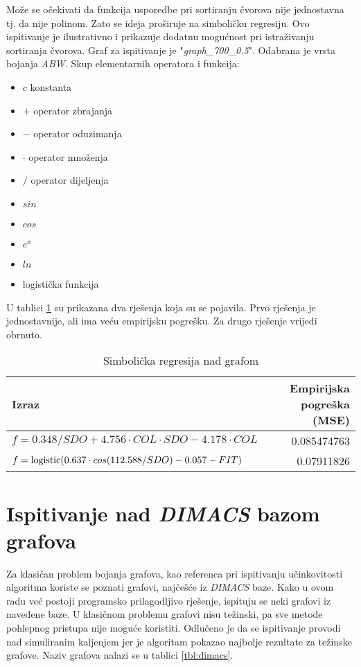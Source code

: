 \documentclass[times, utf8, diplomski, numeric]{fer}
\begin{document}
Može se očekivati da funkcija usporedbe pri sortiranju čvorova nije jednostavna tj. da nije polinom. Zato se ideja proširuje na simboličku regresiju. Ovo ispitivanje je ilustrativno i prikazuje dodatnu mogućnost pri istraživanju sortiranja čvorova. Graf za ispitivanje je "\emph{graph\_700\_0.5}". Odabrana je vrsta bojanja \emph{ABW}. Skup elementarnih operatora i funkcija:

\begin{itemize}
	\item $c$  konstanta
	\item $+$ operator zbrajanja
	\item $-$ operator oduzimanja
	\item $\cdot $ operator množenja
	\item $/$ operator dijeljenja
	\item $sin$
	\item $cos$
	\item $e^x$
	\item $ln$ 
	\item logistička funkcija
\end{itemize} 

U tablici \ref{tbl:sym-reg} su prikazana dva rješenja koja su se pojavila. Prvo rješenja je jednostavnije, ali ima veću empirijsku pogrešku. Za drugo rješenje vrijedi obrnuto.

\begin{table}[htb]
	\caption{Simbolička regresija nad grafom}
	\label{tbl:sym-reg}
	\centering
	\begin{tabular}{|l|r|} \hline
	Izraz & Empirijska pogreška (MSE)\\ \hline \hline
	$f = 0.348/SDO + 4.756\cdot COL \cdot SDO - 4.178\cdot COL$ & 0.085474763\\ \hline
	$f = \textup{logistic}(0.637\cdot cos(112.588/SDO) - 0.057 - FIT)$ & 0.07911826 \\ \hline
	\end{tabular}
\end{table}


\section{Ispitivanje nad \emph{DIMACS} bazom grafova}

Za klasičan problem bojanja grafova, kao referenca pri ispitivanju učinkovitosti algoritma koriste se poznati grafovi, najčešće iz \emph{DIMACS} baze. Kako u ovom radu već postoji programsko prilagodljivo rješenje, ispituju se neki grafovi iz navedene baze. U klasičnom problemu grafovi nisu težinski, pa sve metode pohlepnog pristupa nije moguće koristiti. Odlučeno je da se ispitivanje provodi nad simuliranim kaljenjem jer je algoritam pokazao najbolje rezultate za težinske grafove. Naziv grafova nalazi se u tablici \ref{tbl:dimacs}.
\end{document}
